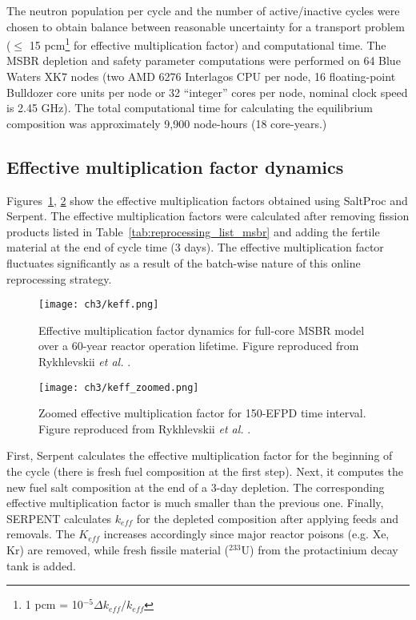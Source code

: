 The neutron population per cycle and the number of active/inactive cycles were 
chosen to obtain balance between reasonable uncertainty for a transport 
problem ($\leq$ 15 pcm\footnote{ 1 pcm = 10$^{-5}\Delta k_{eff}/k_{eff}$} for 
effective multiplication factor) and computational time. The \gls{MSBR} 
depletion and safety parameter computations were performed on 64 Blue Waters 
XK7 nodes (two AMD 6276 Interlagos CPU per node, 16 floating-point Bulldozer 
core units per node or 32 ``integer'' cores per node, nominal clock speed is 
2.45 GHz). The total computational time for calculating the equilibrium 
composition was approximately 9,900 node-hours (18 core-years.)

\subsection{Effective multiplication factor dynamics}
Figures~\ref{fig:keff}, \ref{fig:keff_zoomed} show the effective 
multiplication factors obtained using SaltProc and Serpent. The effective 
multiplication factors were calculated after removing fission products listed 
in  Table~\ref{tab:reprocessing_list_msbr} and adding the fertile material at 
the end of cycle time (3 days). The effective multiplication factor fluctuates 
significantly as a result of the batch-wise nature of this online reprocessing 
strategy. 
\begin{figure}[ht!] 
	\centering
	\texttt{[image: ch3/keff.png]}
	\caption{Effective multiplication factor dynamics for full-core \gls{MSBR} 
		model over a 60-year reactor operation lifetime. Figure reproduced 
		from Rykhlevskii \emph{et al.} \cite{rykhlevskii_modeling_2019}.}
	\label{fig:keff}
\end{figure}
\begin{figure}[ht!] 
	\centering
	\texttt{[image: ch3/keff\_zoomed.png]}
	\caption{Zoomed effective multiplication factor for 150-EFPD time 
	interval. Figure reproduced from Rykhlevskii \emph{et al.}  
	\cite{rykhlevskii_modeling_2019}.}
	\label{fig:keff_zoomed}
\end{figure}

First, Serpent calculates the effective multiplication factor for the  
beginning of the cycle (there is fresh fuel composition at the first step). 
Next, it computes the new fuel salt composition at the end of a 3-day 
depletion. The corresponding effective multiplication factor is much smaller 
than the previous one. Finally, SERPENT calculates $k_{eff}$ for the depleted 
composition after applying feeds and removals. The $K_{eff}$ increases 
accordingly since major reactor poisons (e.g. Xe, Kr) are removed, while fresh 
fissile material ($^{233}$U) from the protactinium decay tank is added.  

